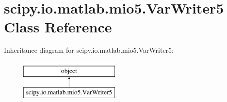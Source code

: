 \hypertarget{classscipy_1_1io_1_1matlab_1_1mio5_1_1VarWriter5}{}\section{scipy.\+io.\+matlab.\+mio5.\+Var\+Writer5 Class Reference}
\label{classscipy_1_1io_1_1matlab_1_1mio5_1_1VarWriter5}
Inheritance diagram for scipy.\+io.\+matlab.\+mio5.\+Var\+Writer5\+:\begin{figure}[H]
\begin{center}
\leavevmode
\includegraphics[height=2.000000cm]{classscipy_1_1io_1_1matlab_1_1mio5_1_1VarWriter5}
\end{center}
\end{figure}
